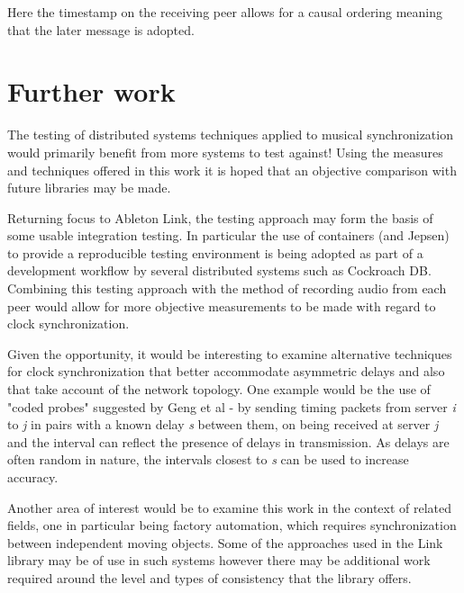 \documentclass[11pt]{article} %
\theoremstyle{plain}
\theoremstyle{definition}
\begin{document}
Here the timestamp on the receiving peer allows for a causal ordering meaning
that the later message is adopted.

\section{Further work}


The testing of distributed systems techniques applied to musical
synchronization would primarily benefit from more systems to test against!
Using the measures and techniques offered in this work it is hoped that an
objective comparison with future libraries may be made.

Returning focus to Ableton Link, the testing approach may form the basis of
some usable integration testing. In particular the use of containers (and
Jepsen) to provide a reproducible testing environment is being adopted as part
of a development workflow by several distributed systems such as Cockroach
DB\cite{cockroach}. Combining this testing approach with the method of
recording audio from each peer would allow for more objective measurements to
be made with regard to clock synchronization.

Given the opportunity, it would be interesting to examine alternative
techniques for clock synchronization that better accommodate asymmetric delays
and also that take account of the network topology. One example would be the
use of "coded probes" suggested by Geng et al\cite{geng2018} - by sending
timing packets from server \textit{i} to \textit{j} in pairs with a known delay
\textit{s} between them, on being received at server \textit{j} and the
interval can reflect the presence of delays in transmission. As delays are
often random in nature, the intervals closest to \textit{s} can be used to
increase accuracy.

Another area of interest would be to examine this work in the context of
related fields, one in particular being factory automation, which requires
synchronization between independent moving objects. Some of the approaches used
in the Link library may be of use in such systems however there may be
additional work required around the level and types of consistency that the
library offers.
\end{document}
